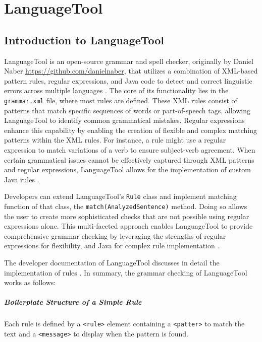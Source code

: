 \chapter{LanguageTool}
\label{language_tool}
\section{Introduction to LanguageTool}

LanguageTool is an open-source grammar and spell checker, originally by Daniel Naber \url{https://github.com/danielnaber}, that utilizes a combination of XML-based pattern rules, regular expressions, and Java code to detect and correct linguistic errors across multiple languages \cite{about_languagetool}. The core of its functionality lies in the \texttt{grammar.xml} file, where most rules are defined. These XML rules consist of patterns that match specific sequences of words or part-of-speech tags, allowing LanguageTool to identify common grammatical mistakes. Regular expressions enhance this capability by enabling the creation of flexible and complex matching patterns within the XML rules. For instance, a rule might use a regular expression to match variations of a verb to ensure subject-verb agreement. When certain grammatical issues cannot be effectively captured through XML patterns and regular expressions, LanguageTool allows for the implementation of custom Java rules \cite{LanguageToolGitHub}. 

Developers can extend LanguageTool's \texttt{Rule} class and implement matching function of that class, the \texttt{match(AnalyzedSentence)} method. Doing so allows the user to create more sophisticated checks that are not possible using regular expressions alone. This multi-faceted approach enables LanguageTool to provide comprehensive grammar checking by leveraging the strengths of regular expressions for flexibility, and Java for complex rule implementation \cite{LanguageToolGitHub}.

The developer documentation of LanguageTool discusses in detail the implementation of rules \cite{LanguageToolDevDocs}. In summary, the grammar checking of LanguageTool works as follows:

\paragraph{Boilerplate Structure of a Simple Rule} Each rule is defined by a \texttt{<rule>} element containing a \texttt{<patter>} to match the text and a \texttt{<message>} to display when the pattern is found.

